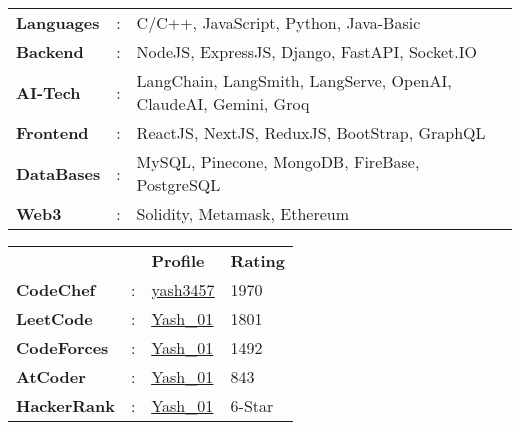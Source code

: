 \documentclass[letterpaper,11pt]{article}
\begin{document}
\begin{minipage}[t]{0.55\textwidth}
  \vspace{1pt}
  \begin{tabular}{>{\raggedright}p{2.2cm} p{0.3cm} p{8.8cm}}
    \textbf{Languages} & : & C/C++, JavaScript, Python, Java-Basic                           \\
    \textbf{Backend}   & : & NodeJS, ExpressJS, Django, FastAPI, Socket.IO                   \\
    \textbf{AI-Tech}   & : & LangChain, LangSmith, LangServe, OpenAI, ClaudeAI, Gemini, Groq \\
    \textbf{Frontend}  & : & ReactJS, NextJS, ReduxJS, BootStrap, GraphQL                    \\
    \textbf{DataBases} & : & MySQL, Pinecone, MongoDB, FireBase, PostgreSQL                  \\
    \textbf{Web3}      & : & Solidity, Metamask, Ethereum                                    \\
  \end{tabular}
\end{minipage}
\hfill
\begin{minipage}[t]{0.40\textwidth}
  \raggedleft
  \vspace{1pt}
  \renewcommand{\arraystretch}{1.1}
  \begin{tabular}{>{\raggedright}p{2.5cm} p{0.1cm} P{2cm} P{2cm}}
    \textbf{}           & \textbf{} & \textbf{Profile}                                                          & \textbf{Rating} \\
    \textbf{CodeChef}   & :         & {\href{https://www.codechef.com/users/yash3457}{\underline{yash3457}}}    & 1970            \\
    \textbf{LeetCode}   & :         & {\href{https://leetcode.com/u/Yash_01/}{\underline{Yash\_01}}}            & 1801            \\
    \textbf{CodeForces} & :         & {\href{https://codeforces.com/profile/Yash_01}{\underline{Yash\_01}}}     & 1492            \\
    \textbf{AtCoder}    & :         & {\href{https://atcoder.jp/users/Yash_01}{\underline{Yash\_01}}}           & 843             \\
    \textbf{HackerRank} & :         & {\href{https://www.hackerrank.com/profile/Yash_01}{\underline{Yash\_01}}} & 6-Star          \\
  \end{tabular}
\end{minipage}
\end{document}
